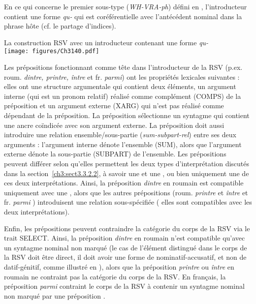En ce qui concerne le premier sous-type (\textit{WH-VRA-ph}) défini en , l’introducteur contient une forme \textit{qu-} qui est coréférentielle avec l’antécédent nominal dans la phrase hôte (cf. le partage d’indices).

\ea \label{ch3:ex140}
La construction RSV avec un introducteur contenant une forme \textit{qu-}\\
\texttt{[image: figures/Ch3140.pdf]}


\z

Les prépositions fonctionnant comme tête dans l’introducteur de la RSV (p.ex. roum. \textit{dintre, printre, între} et fr. \textit{parmi}) ont les propriétés lexicales suivantes : elles ont une structure argumentale qui contient deux éléments, un argument interne (qui est un pronom relatif) réalisé comme complément (COMPS) de la préposition et un argument externe (XARG) qui n’est pas réalisé comme dépendant de la préposition. La préposition sélectionne un syntagme qui contient une ancre coïndicée avec son argument externe. La préposition doit aussi introduire une relation ensemble/sous-partie (\textit{sum-subpart-rel}) entre ses deux arguments : l’argument interne dénote l’ensemble (SUM), alors que l’argument externe dénote la sous-partie (SUBPART) de l’ensemble. Les prépositions peuvent différer selon qu’elles permettent les deux types d’interprétation discutés dans la section~\ref{ch3:sect3.3.2.2}, à savoir une  et une , ou bien uniquement une de ces deux interprétations. Ainsi, la préposition \textit{dintre} en roumain  est compatible uniquement avec une , alors que les autres prépositions (roum. \textit{printre} et \textit{între}  et fr. \textit{parmi} ) introduisent une relation sous-spécifiée ({\cad} elles sont compatibles avec les deux interprétations). 

Enfin, les prépositions peuvent contraindre la catégorie du corps de la RSV via le trait SELECT. Ainsi, la préposition \textit{dintre} en roumain  n’est compatible qu’avec un syntagme nominal non marqué (le cas de l’élément distingué dans le corps de la RSV doit être direct, {\cad} il doit avoir une forme de nominatif-accusatif, et non de datif-génitif, comme illustré en ), alors que la préposition \textit{printre} ou \textit{între} en roumain  ne contraint pas la catégorie du corps de la RSV. En français, la préposition \textit{parmi}  contraint le corps de la RSV à contenir un syntagme nominal non marqué par une préposition . 

